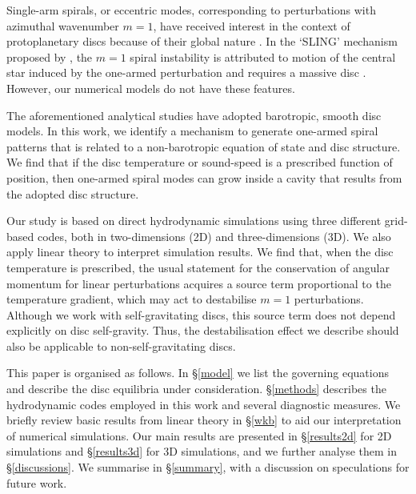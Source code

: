 \documentclass[useAMS,usenatbib]{mn2e}
\begin{document}
Single-arm spirals, or eccentric modes, corresponding to perturbations 
with azimuthal wavenumber $m=1$, have received interest in
the context of protoplanetary discs because of their global nature
\citep{adams89,heemskerk92,laughlin96,tremaine01,papaloizou02,hopkins10}. 
In the `SLING' mechanism proposed by \cite{shu90}, the $m=1$ spiral
instability is attributed to motion of the central star induced by the
one-armed perturbation and requires a massive disc \citep[the former may
have observable consequences, ][]{michael10}. However, our numerical
models do not have these features.   


The aforementioned analytical studies have adopted barotropic, smooth disc models. 
In this work, we identify a mechanism to generate one-armed
spiral patterns that is related to a non-barotropic equation of
state and disc structure. We find that if the disc temperature or
sound-speed is a prescribed function of position, then 
one-armed spiral modes can grow inside a cavity that results from the
adopted disc structure. 

Our study is based on direct hydrodynamic simulations using three
different grid-based codes, both in two-dimensions (2D) and
three-dimensions (3D). We also apply linear
theory to interpret simulation results. We find that, when the disc
temperature is prescribed, the usual statement for the conservation of
angular momentum for linear perturbations acquires a source term
proportional to the temperature gradient, which may act to destabilise
$m=1$ perturbations. Although we work with self-gravitating discs,
this source term does not depend explicitly on disc self-gravity. Thus, the
destabilisation effect we describe should also be applicable to
non-self-gravitating discs. 

This paper is organised as follows. In \S\ref{model} we list the
governing equations and describe the disc equilibria under
consideration. \S\ref{methods} describes the hydrodynamic codes
employed in this work and several diagnostic measures. We briefly
review basic results from linear theory in \S\ref{wkb} to aid our
interpretation of numerical simulations.  Our main results are presented in 
\S\ref{results2d} for 2D simulations and \S\ref{results3d} for 3D
simulations, and we further analyse them in \S\ref{discussions}. 
We summarise in \S\ref{summary}, with a discussion on
speculations for future work. 











\appendix

\end{document}
